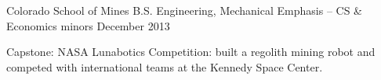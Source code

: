 
\begin{cventries}

  \cvline%
  {Colorado School of Mines} %
  {B.S. Engineering, Mechanical Emphasis \--- CS \& Economics minors} %
  {December 2013} %
  \begin{descriptionstyle}
    \begin{cvsentence}Capstone: NASA Lunabotics Competition: built a regolith mining robot and competed with international teams at the Kennedy Space Center.
    \end{cvsentence}
  \end{descriptionstyle}
  \vspace{-5.0mm}

\end{cventries}
